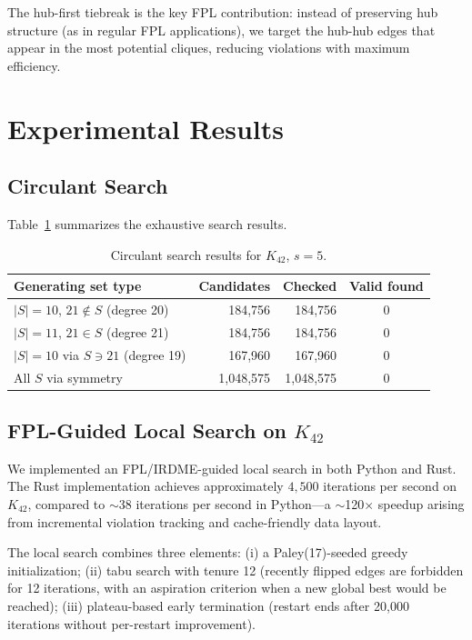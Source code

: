 \documentclass[11pt]{article}
\begin{document}
The hub-first tiebreak is the key FPL contribution: instead of preserving hub
structure (as in regular FPL applications), we target the hub-hub edges that
appear in the most potential cliques, reducing violations with maximum efficiency.

\section{Experimental Results}
\label{sec:z21}

\subsection{Circulant Search}

Table~\ref{tab:circulant} summarizes the exhaustive search results.

\begin{table}[h]
\centering
\begin{tabular}{lrrc}
\toprule
Generating set type & Candidates & Checked & Valid found \\
\midrule
$|S|=10$, $21 \notin S$ (degree 20) & 184,756 & 184,756 & 0 \\
$|S|=11$, $21 \in S$ (degree 21) & 184,756 & 184,756 & 0 \\
$|S|=10$ via $S \ni 21$ (degree 19) & 167,960 & 167,960 & 0 \\
All $S$ via symmetry & 1,048,575 & 1,048,575 & 0 \\
\bottomrule
\end{tabular}
\caption{Circulant search results for $K_{42}$, $s=5$.}
\label{tab:circulant}
\end{table}

\subsection{FPL-Guided Local Search on $K_{42}$}

We implemented an FPL/IRDME-guided local search in both Python and Rust.
The Rust implementation achieves approximately $4{,}500$ iterations per second
on $K_{42}$, compared to $\sim$38 iterations per second in Python---a
$\sim$120$\times$ speedup arising from incremental violation tracking and
cache-friendly data layout.

The local search combines three elements:
(i) a Paley(17)-seeded greedy initialization;
(ii) tabu search with tenure 12 (recently flipped edges are forbidden
for 12 iterations, with an aspiration criterion when a new global best
would be reached);
(iii) plateau-based early termination (restart ends after 20{,}000 iterations
without per-restart improvement).
\end{document}

